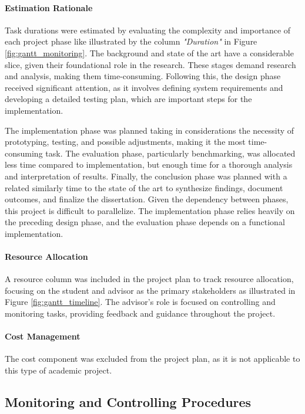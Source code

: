 \paragraph{Estimation Rationale} Task durations were estimated by evaluating the complexity and importance of each project phase like illustrated by the column \textit{"Duration"} in Figure \ref{fig:gantt_monitoring}. The background and state of the art have a considerable slice, given their foundational role in the research. These stages demand research and analysis, making them time-consuming. Following this, the design phase received significant attention, as it involves defining system requirements and developing a detailed testing plan, which are important steps for the implementation.

The implementation phase was planned taking in considerations the necessity of prototyping, testing, and possible adjustments, making it the most time-consuming task. The evaluation phase, particularly benchmarking, was allocated less time compared to implementation, but enough time for a thorough analysis and interpretation of results. Finally, the conclusion phase was planned with a related similarly time to the state of the art to synthesize findings, document outcomes, and finalize the dissertation. Given the dependency between phases, this project is difficult to parallelize. The implementation phase relies heavily on the preceding design phase, and the evaluation phase depends on a functional implementation. 

\paragraph{Resource Allocation} A resource column was included in the project plan to track resource allocation, focusing on the student and advisor as the primary stakeholders as illustrated in Figure \ref{fig:gantt_timeline}. The advisor’s role is focused on controlling and monitoring tasks, providing feedback and guidance throughout the project.

\paragraph{Cost Management} The cost component was excluded from the project plan, as it is not applicable to this type of academic project.

\subsection{Monitoring and Controlling Procedures}

